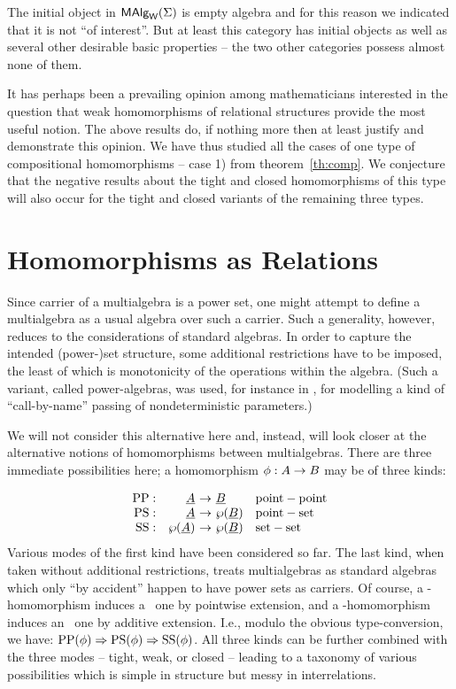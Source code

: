 \documentclass[10pt]{article}
\begin{document}
\noindent
The initial object in $\mbox{\rm\sf MAlg}_{\sf W}(\Sigma)$ is empty algebra and for this reason we indicated
that it is not ``of interest''. But at least this category has initial objects 
as well as several other desirable basic properties -- 
the two other categories possess almost none of them.

It has perhaps been a prevailing opinion among mathematicians interested in the question
that weak homomorphisms of relational structures provide the most useful notion.
The above results do, if nothing more then at least justify and demonstrate
this opinion. We have thus studied all the cases of one type of
 compositional homomorphisms -- case 1) from theorem~\ref{th:comp}. We conjecture that
the negative results about the tight and closed homomorphisms of this type will also
occur for the tight and closed variants of the remaining three types.



\section{Homomorphisms as Relations}
\label{se:horel}

Since carrier of a multialgebra is a power set, one might attempt to
define a multialgebra as a usual algebra over such a carrier.  Such a
generality, however, reduces to the considerations of standard
algebras. In order to capture the intended (power-)set structure, some
additional restrictions have to be imposed, the least of which is
monotonicity of the operations within the algebra. (Such a variant,
called power-algebras, was used, for instance in \cite{c:130}, for
modelling a kind of ``call-by-name'' passing of nondeterministic
parameters.)

We will not consider this alternative here and, instead, will look
closer at the alternative notions of homomorphisms between
multialgebras. There are three
immediate possibilities here; a homomorphism $\phi:A\rightarrow B$ may be of
three kinds:

\[ \begin{array}{rr@{\ \into\ }ll}
\PP: & \under A & \under B & {\rm point-point} \\
\PS: & \under A & \PSet(\under B) & {\rm point-set} \\
\SSs:& \PSet(\under A) & \PSet(\under B) & {\rm set-set}
\end{array}
\]
%
Various modes of the first kind have been considered so far.
The last kind, when
taken without additional restrictions, treats multialgebras
as standard algebras which only ``by
accident'' happen to have power sets as carriers.  Of course, a
\PP-homomorphism induces a \PS\ one by pointwise extension, and a
\PS-homomorphism induces an \SSs\ one by additive extension.  I.e.,
modulo the obvious type-conversion, we have: ${\rm PP}(\phi) \Rightarrow
{\rm PS}(\phi) \Rightarrow {\rm SS}(\phi)$. All three kinds can be further
combined with the three modes -- tight, weak, or closed -- leading to
a taxonomy of various possibilities which is simple in structure but
messy in interrelations.  
\end{document}
